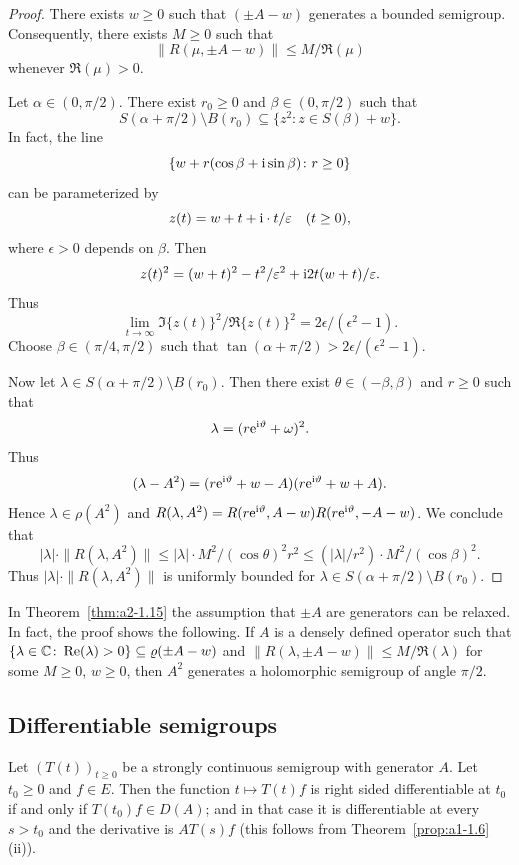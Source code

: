 \begin{proof}
There exists $w \geq 0$ such that $(\pm A - w)$ generates a bounded semigroup.
Consequently, there exists $M \geq 0$ such that 
%
\[
	\|R(\mu,\pm A - w)\| \leq M/\Re(\mu)
\]
%
whenever $\Re(\mu) > 0$.

Let $\alpha \in (0,\pi/2)$.
There exist $r_0 \geq 0$ and $\beta \in (0,\pi/2)$ such that
\[
    S(\alpha+\pi/2)\setminus B(r_{0}) \subseteq \{ z^2 \colon z \in S(\beta) + w \}.
\]
In fact, the line 
%
\[
	\{w + r(\cos\beta + \im \sin\beta) \colon r \geq 0\} 
\]
%
can be parameterized by 
%
\[
	 z(t) = w + t + \im\cdot t/\epsilon \quad (t \geq 0) ,
\]
%
where $\epsilon > 0$ depends on $\beta$.
Then 
%
\[
	z(t)^2 = (w + t)^2 - t^2/\epsilon^2 + \im 2t(w+t)/\epsilon .
\]
%
Thus 
%
\[
	\lim_{t \to \infty} \Im\{z(t)\}^2/\Re\{z(t)\}^2 = 2\epsilon/(\epsilon^2-1) .
\]
%
Choose $\beta \in (\pi/4,\pi/2)$ such that $\tan(\alpha + \pi/2) > 2\epsilon/(\epsilon^2-1)$. 

Now let $\lambda \in S(\alpha+\pi/2)\setminus B(r_{0})$.
Then there exist $\theta \in (-\beta,\beta)$ and $r \geq 0$ such that 
%
\[
	 \lambda = (r\eu^{\im\theta}+\omega)^2 .
\]
%
Thus %
\[
	(\lambda-A^2) = (r\eu^{\im\theta}+w - A)(r\eu^{\im\theta}+w + A) .
\]
%
Hence $\lambda \in \rho(A^2)$ and $R(\lambda,A^2) = R(r\eu^{\im\theta},A-w)R(r\eu^{\im\theta},-A-w)$.
We conclude that 
\[
|\lambda| \cdot \|R(\lambda,A^2)\| \leq |\lambda| \cdot M^2/(\cos\theta)^2r^2 \leq (|\lambda|/r^2)\cdot M^2/(\cos\beta)^2.
\]
Thus $|\lambda| \cdot \|R(\lambda,A^2)\|$ is uniformly bounded for $\lambda \in S(\alpha+\pi/2) \setminus B(r_0)$.
\end{proof}
\begin{remark*}\label{rem:a2-1.7-kgk}
In Theorem~\ref{thm:a2-1.15}  
the assumption that $\pm A$ are generators can be relaxed.
In fact, the proof shows the following.
If\/ $A$ is a densely defined operator such that 
$\{\lambda \in \C \colon \Re(\lambda) > 0\} \subseteq \rho(\pm A - w)$ and 
$\|R(\lambda,\pm A - w)\| \leq M/\Re(\lambda)$ for some $M \geq 0$, $w \geq 0$, then $A^2$ generates a holomorphic semigroup of angle $\pi/2$.
\end{remark*}

\subsection{Differentiable semigroups} \label{subsec:a2-1.se5}%
Let $(T(t))_{t\geq 0}$ be a strongly continuous semigroup with generator $A$.
Let $t_0 \geq 0$ and $f \in E$.
Then the function $t \mapsto T(t)f$ is right sided differentiable at $t_0$ if and only if\/ $T(t_0)f \in D(A)$; and in that case it is differentiable at every $s > t_0$ and the derivative is $AT(s)f$ (this follows from Theorem~\ref{prop:a1-1.6}\,(ii)).

